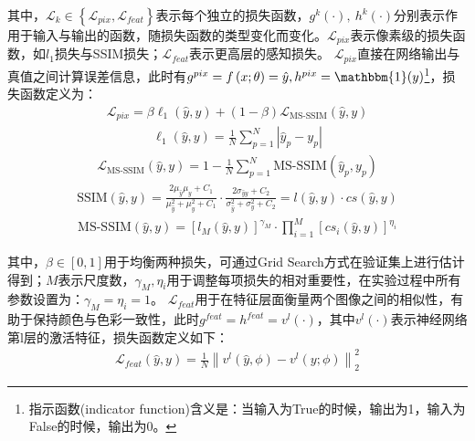 \documentclass[letterpaper,12pt]{article}
\begin{document}
		其中，$\mathcal{L}_k\in\left\{\mathcal{L}_{pix},\mathcal{L}_{feat}\right\}$表示每个独立的损失函数，$g^k(\cdot),\ h^k(\cdot)$分别表示作用于输入与输出的函数，随损失函数的类型变化而变化。$\mathcal{L}_{pix}$表示像素级的损失函数，如$l_1$损失与SSIM损失；$\mathcal{L}_{feat}$表示更高层的感知损失。
		$\mathcal{L}_{pix}$直接在网络输出与真值之间计算误差信息，此时有$g^{pix}=f\left(x;\theta\right)=\hat{y},h^{pix}=\mathbbm{1}(y)$\footnote{指示函数(indicator function)含义是：当输入为True的时候，输出为1，输入为False的时候，输出为0。}，损失函数定义为：
		\begin{equation}
			\begin{aligned}
				\mathcal{L}_{pix}=\beta\ell_1\left(\hat{y},y\right)+\left(1-\beta\right)\mathcal{L}_{\text{MS-SSIM}}\left(\hat{y},y\right)
			\end{aligned}
		\end{equation}
		\begin{equation}
			\begin{aligned}
				\ell_1(\hat{y},y)=\frac{1}{N}\sum_{p=1}^{N}\left|{\hat{y}}_p-y_p\right|
			\end{aligned}
		\end{equation}
		\begin{equation}
			\begin{aligned}
				\mathcal{L}_{\text{MS-SSIM}}\left(\hat{y},y\right)=1-\frac{1}{N}\sum_{p=1}^{N}{\text{MS-SSIM}}({\hat{y}}_p,y_p)
			\end{aligned}
		\end{equation}
		\begin{equation}
			\begin{aligned}
				\text{SSIM}\left(\hat{y},y\right)=\frac{2\mu_{\hat{y}}\mu_y+C_1}{\mu_{\hat{y}}^2+\mu_y^2+C_1}\cdot\frac{2\sigma_{\hat{y}y}+C_2}{\sigma_{\hat{y}}^2+\sigma_y^2+C_2}=l\left(\hat{y},y\right)\cdot cs\left(\hat{y},y\right)
			\end{aligned}
		\end{equation}
		\begin{equation}
			\begin{aligned}
				\text{MS-SSIM}\left(\hat{y},y\right)=\left[l_M\left(\hat{y},y\right)\right]^{\gamma_M}\cdot\prod_{i=1}^{M}\left[{cs}_i\left(\hat{y},y\right)\right]^{\eta_i}
			\end{aligned}
		\end{equation}
		
		其中，$\beta\in\left[0,1\right]$用于均衡两种损失，可通过Grid Search方式在验证集上进行估计得到；$M$表示尺度数，$\gamma_M,\eta_i$用于调整每项损失的相对重要性，在实验过程中所有参数设置为：$\gamma_M=\eta_i=1$。
		$\mathcal{L}_{feat}$用于在特征层面衡量两个图像之间的相似性，有助于保持颜色与色彩一致性，此时$g^{feat}=h^{feat}=v^l(\cdot)$，其中$v^l(\cdot)$表示神经网络第l层的激活特征，损失函数定义如下：
		\begin{equation}
			\begin{aligned}
				\mathcal{L}_{feat}\left(\hat{y},y\right) = \frac{1}{N}{\left\| v^l\left(\hat{y},\phi \right) - v^l \left(y ; \phi\right) \right \|}_{2}^{2}
			\end{aligned}
		\end{equation}
	
\end{document}
